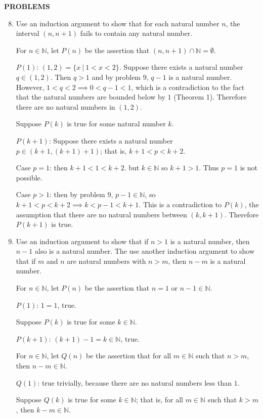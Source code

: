 \documentclass[a4paper,10pt]{book}
\theoremstyle{plain} %
\begin{document}
\begin{center}
	\textbf{PROBLEMS}
\end{center}
\begin{enumerate}
	\setcounter{enumi}{7}
	\item Use an induction argument to show that for each natural number $n$, the interval $(n, n+1)$ fails to contain any natural number.\par
	For $n \in \mathbb{N}$, let $P(n)$ be the assertion that $(n, n+1) \cap \mathbb{N} = \emptyset$.\par
	$P(1)$: $(1, 2)=\{x\ |\ 1<x<2\}$. Suppose there exists a natural number $q \in (1, 2)$. Then $q>1$ and by problem 9, $q-1$ is a natural number. 
	However, $1<q<2 \implies 0<q-1<1$, which is a contradiction to the fact that the natural numbers are bounded below by $1$ (Theorem 1). Therefore there are no natural numbers in $(1, 2)$.\par
	Suppose $P(k)$ is true for some natural number $k$.\par
	$P(k+1)$: Suppose there exists a natural number $p \in (k+1, (k+1)+1)$; that is, $k+1<p<k+2$.\par
	Case $p=1$: then $k+1<1<k+2$. but $k \in \mathbb{N}$ so $k+1 >1$. Thus $p=1$ is not possible.\par
	Case $p>1$: then by problem 9, $p-1 \in \mathbb{N}$, so $k+1<p<k+2 \implies k<p-1<k+1$. This is a contradiction to $P(k)$, the assumption that there are no natural numbers between $(k,k+1)$.
	Therefore $P(k+1)$ is true.
	\item Use an induction argument to show that if $n>1$ is a natural number, then $n-1$ also is a natural number. The use another induction argument to show that if $m$ and $n$ are natural numbers with $n>m$, then $n-m$ is a natural number.\par
	For $n \in \mathbb{N}$, let $P(n)$ be the assertion that $n=1$ or $n-1 \in \mathbb{N}$.\par
	$P(1)$: $1=1$, true.\par
	Suppose $P(k)$ is true for some $k \in \mathbb{N}$.\par
	$P(k+1)$: $(k+1)-1 = k \in \mathbb{N}$, true.\par
	\medskip
	For $n \in \mathbb{N}$, let $Q(n)$ be the assertion that for all $m \in \mathbb{N}$ such that $n>m$, then $n-m \in \mathbb{N}$.\par
	$Q(1)$: true trivially, because there are no natural numbers less than $1$.\par
	Suppose $Q(k)$ is true for some $k \in \mathbb{N}$; that is, for all $m \in \mathbb{N}$ such that $k>m$, then $k-m \in \mathbb{N}.$\par

\end{enumerate}
\end{document}
